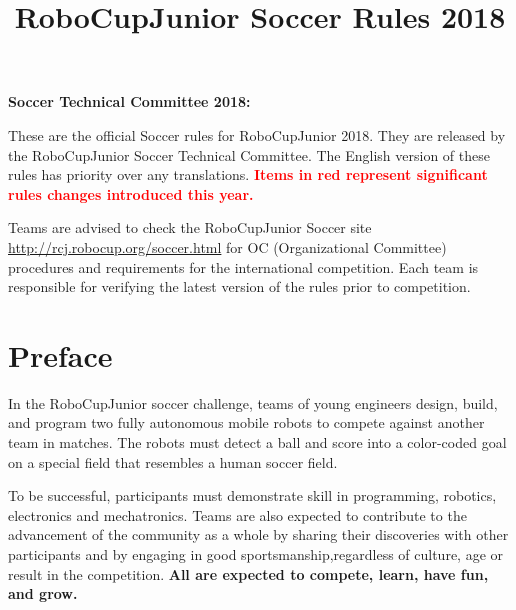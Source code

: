 \documentclass{article}
\title{\vspace{-5ex}RoboCupJunior Soccer Rules 2018\vspace{-5ex}}
\date{\vspace{-2ex}}
\begin{document}
\maketitle
\thispagestyle{firststyle}

\textbf{Soccer Technical Committee 2018:}


These are the official Soccer rules for RoboCupJunior 2018. They are released
by the RoboCupJunior Soccer Technical Committee. The English version of these
rules has priority over any translations. \textcolor{red}{\textbf{Items in red
represent significant rules changes introduced this year.}}

Teams are advised to check the RoboCupJunior Soccer site
\href{http://rcj.robocup.org/soccer.html}{http://rcj.robocup.org/soccer.html}
for OC (Organizational Committee) procedures and requirements for the
international competition. Each team is responsible for verifying the latest version of the
rules prior to competition.

\section*{Preface}

In the RoboCupJunior soccer challenge, teams of young engineers design, build,
and program two fully autonomous mobile robots to compete against another team
in matches. The robots must detect a ball and score into a color-coded goal on
a special field that resembles a human soccer field.

To be successful, participants must demonstrate skill in programming, robotics,
electronics and mechatronics.  Teams are also expected to contribute to the
advancement of the community as a whole by sharing their discoveries with other
participants and by engaging in good sportsmanship,regardless of culture, age or
result in the competition. \textbf{All are expected to compete,
learn, have fun, and grow.}
\end{document}
